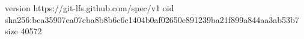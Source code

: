 version https://git-lfs.github.com/spec/v1
oid sha256:bca35907ea07cba8b8b6c6c1404b0af02650e891239ba21f899a844aa3ab53b7
size 40572
